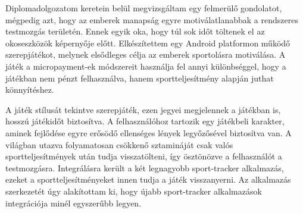 Diplomadolgozatom keretein belül megvizsgáltam egy felmerülő gondolatot, mégpedig azt, hogy az emberek manapság egyre motiválatlanabbak a rendszeres testmozgás területén. 
Ennek egyik oka, hogy túl sok időt töltenek el az okoseszközök képernyője előtt. 
Elkészítettem egy Android platformon működő szerepjátékot, melynek elsődleges célja az emberek sportolásra motiválása. 
A játék a micropayment-ek módszereit használja fel annyi különbséggel, hogy a játékban nem pénzt felhasználva, hanem sportteljesítmény alapján juthat könnyítéshez. 

A játék stílusát tekintve szerepjáték, ezen jegyei megjelennek a játékban is, hosszú játékidőt biztosítva. 
A felhasználóhoz tartozik egy játékbeli karakter, aminek fejlődése egyre erősödő ellenséges lények legyőzősével biztosítva van. 
A világban utazva folyamatosan csökkenő sztamináját csak valós sportteljesítmények után tudja visszatölteni, így ösztönözve a felhasználót a testmozgásra. 
Integrálásra került a két legnagyobb sport-tracker alkalmazás, ezeket a sportteljesítményeket innen tudja a játék visszanyerni. 
Az alkalmazás szerkezetét úgy alakítottam ki, hogy újabb sport-tracker alkalmazások integrációja minél egyszerűbb legyen. 
